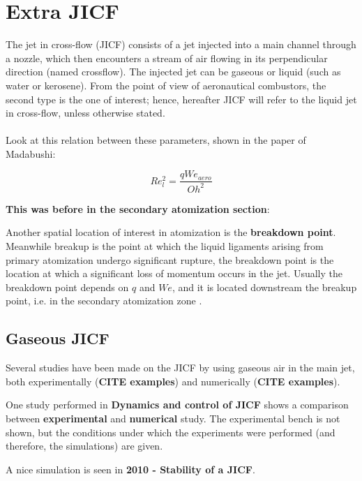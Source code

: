 \chapter{Extra JICF}

The jet in cross-flow (JICF) consists of a jet injected into a main channel through a nozzle, which then encounters a stream of air flowing in its perpendicular direction (named crossflow). The injected jet can be gaseous or liquid (such as water or kerosene). From the point of view of aeronautical combustors, the second type is the one of interest; hence, hereafter JICF will refer to the liquid jet in cross-flow, unless otherwise stated. \\\\


Look at this relation between these parameters, shown in the paper of Madabushi:

\begin{equation}
Re_l^2 = \frac{q We_{aero}}{Oh^2}
\end{equation}


\textbf{This was before in the secondary atomization section}:

Another spatial location of interest in atomization is the \textbf{breakdown point}. Meanwhile breakup is the point at which the liquid ligaments arising from primary atomization undergo significant rupture, the breakdown point is the location at which a significant loss of momentum occurs in the jet. Usually the breakdown point depends on $q$ and $We$, and it is located downstream the breakup point, i.e. in the secondary atomization zone .

\section{Gaseous JICF}


Several studies have been made on the JICF by using gaseous air in the main jet, both experimentally (\textbf{CITE examples}) and numerically (\textbf{CITE examples}). 

One study performed in \textbf{Dynamics and control of JICF} shows a comparison between \textbf{experimental} and \textbf{numerical} study. The experimental bench is not shown, but the conditions under which the experiments were performed (and therefore, the simulations) are given.

A nice simulation is seen in \textbf{2010 - Stability of a JICF}.

